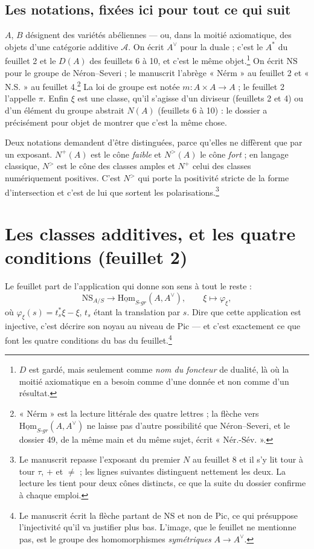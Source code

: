 \documentclass[11pt,a4paper]{article}
\begin{document}
\subsection*{Les notations, fixées ici pour tout ce qui suit}

$A$, $B$ désignent des variétés abéliennes — ou, dans la moitié axiomatique,
des objets d'une catégorie additive $\mathcal{A}$. On écrit $A^{\vee}$ pour la
duale ; c'est le $A^{*}$ du feuillet 2 et le $D(A)$ des feuillets 6 à 10, et
c'est le même objet.\footnote{$D$ est gardé, mais seulement comme \emph{nom du
foncteur} de dualité, là où la moitié axiomatique en a besoin comme d'une
donnée et non comme d'un résultat.} On écrit $\mathrm{NS}$ pour le groupe de
Néron--Severi ; le manuscrit l'abrège « Nérm » au feuillet 2 et « N.S. » au
feuillet 4.\footnote{« Nérm » est la lecture littérale des quatre lettres ; la
flèche vers $\underline{\mathrm{Hom}}_{S\text{-}gr}(A, A^{\vee})$ ne laisse pas
d'autre possibilité que Néron--Severi, et le dossier 49, de la même main et du
même sujet, écrit « Nér.-Sév. ».} La loi de groupe est notée $m : A \times A
\to A$ ; le feuillet 2 l'appelle $\pi$. Enfin $\xi$ est une classe, qu'il
s'agisse d'un diviseur (feuillets 2 et 4) ou d'un élément du groupe abstrait
$N(A)$ (feuillets 6 à 10) : le dossier a précisément pour objet de montrer que
c'est la même chose.

Deux notations demandent d'être distinguées, parce qu'elles ne diffèrent que
par un exposant. $N^{+}(A)$ est le cône \emph{faible} et $N^{>}(A)$ le cône
\emph{fort} ; en langage classique, $N^{>}$ est le cône des classes amples et
$N^{+}$ celui des classes numériquement positives. C'est $N^{>}$ qui porte la
positivité stricte de la forme d'intersection et c'est de lui que sortent les
polarisations.\footnote{Le manuscrit repasse l'exposant du premier $N$ au
feuillet 8 et il s'y lit tour à tour $\tau$, $+$ et $\neq$ ; les lignes
suivantes distinguent nettement les deux. La lecture les tient pour deux cônes
distincts, ce que la suite du dossier confirme à chaque emploi.}

\section*{Les classes additives, et les quatre conditions (feuillet 2)}

Le feuillet part de l'application qui donne son sens à tout le reste :
\[
  \mathrm{NS}_{A/S} \longrightarrow
  \underline{\mathrm{Hom}}_{S\text{-}gr}(A, A^{\vee}),
  \qquad \xi \longmapsto \varphi_{\xi},
\]
où $\varphi_{\xi}(s) = t_{s}^{*}\xi - \xi$, $t_{s}$ étant la translation par
$s$. Dire que cette application est injective, c'est décrire son noyau au
niveau de $\mathrm{Pic}$ — et c'est exactement ce que font les quatre
conditions du bas du feuillet.\footnote{Le manuscrit écrit la flèche partant de
$\mathrm{NS}$ et non de $\mathrm{Pic}$, ce qui présuppose l'injectivité qu'il
va justifier plus bas. L'image, que le feuillet ne mentionne pas, est le groupe
des homomorphismes \emph{symétriques} $A \to A^{\vee}$.}
\end{document}
